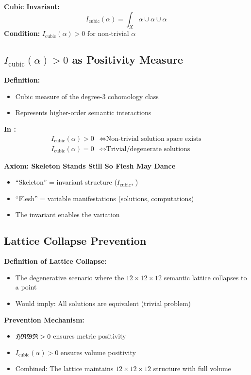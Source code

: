 \textbf{Cubic Invariant:}
\begin{equation}
    I_{\text{cubic}}(\alpha) = \int_X \alpha \cup \alpha \cup \alpha
\end{equation}
\textbf{Condition:} $I_{\text{cubic}}(\alpha) > 0$ for non-trivial $\alpha$

\subsection{$I_{\text{cubic}}(\alpha) > 0$ as Positivity Measure}

\textbf{Definition:}
\begin{itemize}
    \item Cubic measure of the degree-3 cohomology class
    \item Represents higher-order semantic interactions
\end{itemize}

\textbf{In \ALQC:}
\begin{align}
    I_{\text{cubic}}(\alpha) > 0 &\iff \text{Non-trivial solution space exists} \\
    I_{\text{cubic}}(\alpha) = 0 &\iff \text{Trivial/degenerate solutions}
\end{align}

\textbf{Axiom: Skeleton Stands Still So Flesh May Dance}
\begin{itemize}
    \item ``Skeleton'' = invariant structure ($I_{\text{cubic}}$, \HRBR)
    \item ``Flesh'' = variable manifestations (solutions, computations)
    \item The invariant enables the variation
\end{itemize}

\subsection{Lattice Collapse Prevention}

\textbf{Definition of Lattice Collapse:}
\begin{itemize}
    \item The degenerative scenario where the $12\times 12\times 12$ semantic lattice collapses to a point
    \item Would imply: All solutions are equivalent (trivial problem)
\end{itemize}

\textbf{Prevention Mechanism:}
\begin{itemize}
    \item $\mathfrak{HRBR} > 0$ ensures metric positivity
    \item $I_{\text{cubic}}(\alpha) > 0$ ensures volume positivity
    \item Combined: The lattice maintains $12\times 12\times 12$ structure with full volume
\end{itemize}

